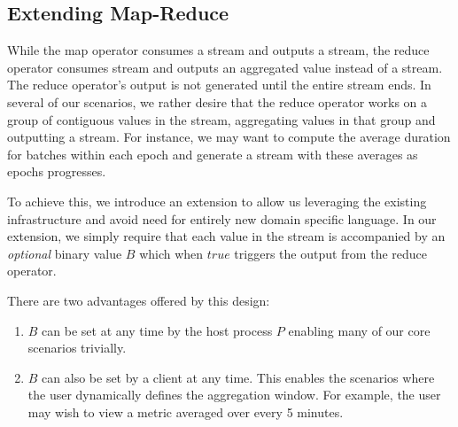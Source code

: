 \documentclass[sigchi]{acmart} %
\begin{document}


\subsection{Extending Map-Reduce}\label{map-reduce-ext}
While the map operator consumes a stream and outputs a stream, the reduce operator consumes stream and outputs an aggregated value instead of a stream. The reduce operator's output is not generated until the entire stream ends. In several of our scenarios, we rather desire that the reduce operator works on a group of contiguous values in the stream, aggregating values in that group and outputting a stream. For instance, we may want to compute the average duration for batches within each epoch and generate a stream with these averages as epochs progresses.

To achieve this, we introduce an extension to allow us leveraging the existing infrastructure and avoid need for entirely new domain specific language. In our extension, we simply require that each value in the stream is accompanied by an \emph{optional} binary value $B$ which when $true$ triggers the output from the reduce operator.

There are two advantages offered by this design:

\begin{enumerate}
  \item $B$ can be set at any time by the host process $P$ enabling many of our core scenarios trivially.
  \item $B$ can also be set by a client at any time. This enables the scenarios where the user dynamically defines the aggregation window. For example, the user may wish to view a metric averaged over every 5 minutes.
\end{enumerate}
\end{document}
